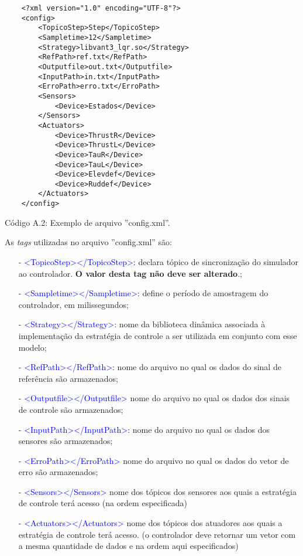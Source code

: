 	\begin{verbatim}
	<?xml version="1.0" encoding="UTF-8"?>
	<config>
		<TopicoStep>Step</TopicoStep>
		<Sampletime>12</Sampletime>
		<Strategy>libvant3_lqr.so</Strategy>
		<RefPath>ref.txt</RefPath>
		<Outputfile>out.txt</Outputfile>
		<InputPath>in.txt</InputPath>
		<ErroPath>erro.txt</ErroPath>
		<Sensors>
			<Device>Estados</Device>
		</Sensors>
		<Actuators>
			<Device>ThrustR</Device>
			<Device>ThrustL</Device>
			<Device>TauR</Device>
			<Device>TauL</Device>
			<Device>Elevdef</Device>
			<Device>Ruddef</Device>
		</Actuators>
	</config>
	\end{verbatim}
	
	\centerline{Código A.2: Exemplo de arquivo ''config.xml''.}
	
	\vspace{1cm}
	
	As \textit{tags} utilizadas no arquivo ''config.xml'' são:
	\small
	\begin{itemize}
	\setlength{\itemsep}{1pt}
	\setlength{\parskip}{0pt}
	\setlength{\parsep}{0pt}
	\item[-] \textcolor{blue}{<TopicoStep></TopicoStep>}: declara tópico de sincronização do simulador ao controlador. \textbf{O valor desta tag não deve ser alterado}.;
	\item[-] \textcolor{blue}{<Sampletime></Sampletime>}: define o período de amostragem do controlador, em milissegundos;
	\item[-] \textcolor{blue}{<Strategy></Strategy>}: nome da biblioteca dinâmica associada à implementação da estratégia de controle a ser utilizada em conjunto com esse modelo;
	\item[-] \textcolor{blue}{<RefPath></RefPath>}: nome do arquivo no qual os dados do sinal de referência são armazenados;
	\item[-] \textcolor{blue}{<Outputfile></Outputfile>} nome do arquivo no qual os dados dos sinais de controle são armazenados;
	\item[-] \textcolor{blue}{<InputPath></InputPath>}: nome do arquivo no qual os dados dos sensores são armazenados;
	\item[-] \textcolor{blue}{<ErroPath></ErroPath>} nome do arquivo no qual os dados do vetor de erro são armazenados;
	\item[-] \textcolor{blue}{<Sensors></Sensors>} nome dos tópicos dos sensores aos quais a estratégia de controle terá acesso (na ordem especificada)
	\item[-] \textcolor{blue}{<Actuators></Actuators>} nome dos tópicos dos atuadores aos quais a estratégia de controle terá acesso. (o controlador deve retornar um vetor com a mesma quantidade de dados e na ordem aqui especificados)
	\end{itemize}\normalsize
	\label{config.xml}

